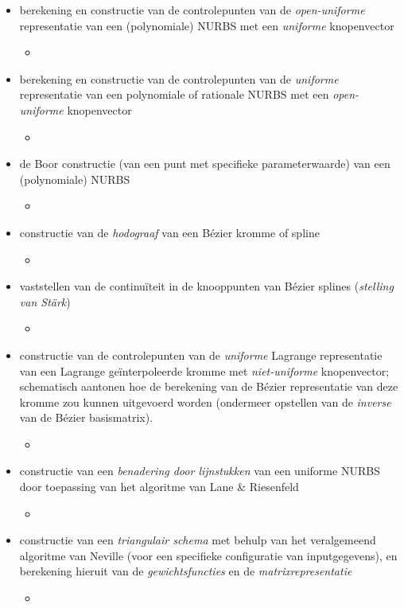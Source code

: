 \documentclass{report}
\newcommand{\vraag}[2]{
	\item #1
	
	#2
}
\begin{document}
\begin{itemize}
		\vraag{ berekening en constructie van de controlepunten van de \textit{open-uniforme} representatie van een (polynomiale) NURBS met een \textit{uniforme} knopenvector}{\begin{itemize} \item {} \end{itemize}}
		\vraag{ berekening en constructie van de controlepunten van de \textit{uniforme} representatie van een polynomiale of rationale NURBS met een \textit{open-uniforme} knopenvector}{\begin{itemize} \item {} \end{itemize}}
		\vraag{ de Boor constructie (van een punt met specifieke parameterwaarde) van een (polynomiale) NURBS}{\begin{itemize} \item {} \end{itemize}}
		\vraag{ constructie van de \textit{hodograaf} van een Bézier kromme of spline}{\begin{itemize} \item {} \end{itemize}}
		\vraag{ vaststellen van de continuïteit in de knooppunten van Bézier splines (\textit{stelling van Stärk})}{\begin{itemize} \item {} \end{itemize}}
		\vraag{ constructie van de controlepunten van de \textit{uniforme} Lagrange representatie van een Lagrange geïnterpoleerde kromme met \textit{niet-uniforme} knopenvector; schematisch aantonen hoe de berekening van de Bézier representatie van deze kromme zou kunnen uitgevoerd worden (ondermeer opstellen van de \textit{inverse} van de Bézier basismatrix).}{\begin{itemize} \item {} \end{itemize}}
		\vraag{ constructie van een  \textit{benadering door lijnstukken} van een uniforme NURBS door toepassing van het algoritme van Lane \& Riesenfeld}{\begin{itemize} \item {} \end{itemize}}
		\vraag{ constructie van een \textit{triangulair schema} met behulp van het veralgemeend algoritme van Neville (voor een specifieke configuratie van inputgegevens), en berekening hieruit van de \textit{gewichtsfuncties} en de \textit{matrixrepresentatie}}{\begin{itemize} \item \todo{oplossen} \end{itemize}}
		
	\end{itemize}
	
\end{document}
